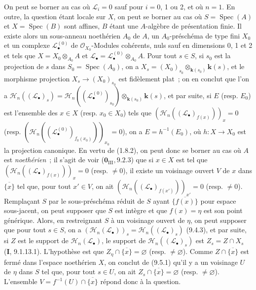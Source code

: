 On peut se borner au cas où $\mathcal L_i=0$ sauf pour $i=0$, 1 ou 2, et où
$n=1$. En outre, la question étant locale sur $X$, on peut se borner au cas où
$S=\operatorname{Spec}(A)$ et $X=\operatorname{Spec}(B)$ sont affines, $B$
étant une $A$-algèbre de présentation finie. Il existe alors un sous-anneau
noethérien $A_0$ de $A$, un $A_0$-préschéma de type fini $X_0$ et un complexe
$\mathcal L_\bullet^{(0)}$ de $\mathcal O_{X_0}$-Modules cohérents, nuls sauf en
dimensions 0, 1 et 2 et tels que
$X=X_0\otimes_{A_0}A$ et
$\mathcal L_\bullet=\mathcal L_\bullet^{(0)}\otimes_{A_0}A$. Pour tout
$s\in S$, si $s_0$ est la projection de $s$ dans
$S_0=\operatorname{Spec}(A_0)$, on a
$X_s=(X_0)_{s_0}\otimes_{\mathbf{k}(s_0)}\boldsymbol{k}(s)$, et le morphisme projection
$X_s\to(X_0)_{s_0}$ est fidèlement plat~; on en conclut que l'on a
$\mathcal H_n((\mathcal L_\bullet)_s)=
\mathcal H_n((\mathcal L_\bullet^{(0)})_{s_0})
\otimes_{\mathbf{k}(s_0)}\boldsymbol{k}(s)$,
et par suite, si $E$ (resp. $E_0$) est l'ensemble des $x\in X$ (resp.
$x_0\in X_0$) tels que
$(\mathcal H_n((\mathcal L_\bullet)_{f(x)}))_x=0$
(resp.
$(\mathcal H_n((\mathcal L_\bullet^{(0)})_{f_0(x_0)}))_{x_0}=0$),
on a $E=h^{-1}(E_0)$, où $h:X\to X_0$ est la projection canonique. En vertu
de (1.8.2), on peut donc se borner au cas où $A$ est \emph{noethérien}~; il
s'agit de voir ($\mathbf 0_{\mathrm{III}},9.2.3$) que si $x\in X$ est tel que
$(\mathcal H_n((\mathcal L_\bullet)_{f(x)}))_x=0$ (resp. $\neq0$), il existe un
voisinage ouvert $V$ de $x$ dans $\overline{\{x\}}$ tel que, pour tout
$x'\in V$, on ait
$(\mathcal H_n((\mathcal L_\bullet)_{f(x')}))_{x'}=0$ (resp. $\neq0$).
Remplaçant $S$ par le sous-préschéma réduit de $S$ ayant
$\overline{\{f(x)\}}$ pour espace sous-jacent, on peut supposer que $S$ est
intègre et que $f(x)=\eta$ est son point générique. Alors, en restreignant $S$
à un voisinage ouvert de $\eta$, on peut supposer que pour tout $s\in S$, on a
$(\mathcal H_n(\mathcal L_\bullet))_s=
\mathcal H_n((\mathcal L_\bullet)_s)$ (9.4.3), et par suite, si $Z$ est le
support de $\mathcal H_n(\mathcal L_\bullet)$, le support de
$\mathcal H_n((\mathcal L_\bullet)_s)$ est $Z_s=Z\cap X_s$
(\textbf{I}, 9.1.13.1). L'hypothèse est que
$Z_\eta\cap\overline{\{x\}}=\varnothing$ (resp. $\neq\varnothing$). Comme
$Z\cap\overline{\{x\}}$ est fermé dans l'espace noethérien $X$, on conclut de
(9.5.1) qu'il y a un voisinage $U$ de $\eta$ dans $S$ tel que, pour tout
$s\in U$, on ait $Z_s\cap\overline{\{x\}}=\varnothing$ (resp.
$\neq\varnothing$). L'ensemble $V=f^{-1}(U)\cap\overline{\{x\}}$ répond donc à
la question.
